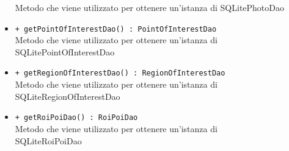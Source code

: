 \documentclass[../DefinizioneDiProdotto.tex]{subfiles}
\begin{document}
\begin{description}
\begin{itemize}
		Metodo che viene utilizzato per ottenere un'istanza di SQLitePhotoDao
		\item \texttt{+ getPointOfInterestDao() : PointOfInterestDao}\\
		Metodo che viene utilizzato per ottenere un'istanza di SQLitePointOfInterestDao
		\item \texttt{+ getRegionOfInterestDao() : RegionOfInterestDao}\\
		Metodo che viene utilizzato per ottenere un'istanza di SQLiteRegionOfInterestDao
		\item \texttt{+ getRoiPoiDao() : RoiPoiDao}\\
		Metodo che viene utilizzato per ottenere un'istanza di SQLiteRoiPoiDao
	\end{itemize}
\end{description}
\end{document}
